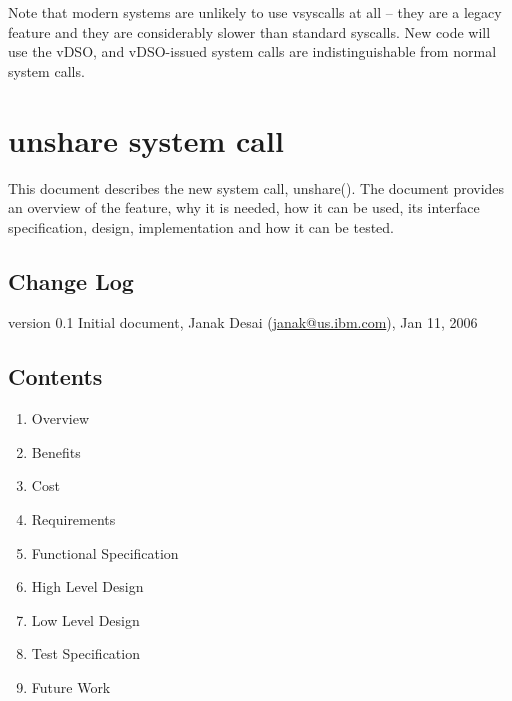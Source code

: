 \documentclass[a4paper,8pt,english]{sphinxmanual}
\begin{document}
Note that modern systems are unlikely to use vsyscalls at all -- they
are a legacy feature and they are considerably slower than standard
syscalls.  New code will use the vDSO, and vDSO-issued system calls
are indistinguishable from normal system calls.


\chapter{unshare system call}
\label{userspace-api/unshare:unshare-system-call}\label{userspace-api/unshare::doc}
This document describes the new system call, unshare(). The document
provides an overview of the feature, why it is needed, how it can
be used, its interface specification, design, implementation and
how it can be tested.


\section{Change Log}
\label{userspace-api/unshare:change-log}
version 0.1  Initial document, Janak Desai (\href{mailto:janak@us.ibm.com}{janak@us.ibm.com}), Jan 11, 2006


\section{Contents}
\label{userspace-api/unshare:contents}\begin{enumerate}
\item {} 
Overview

\item {} 
Benefits

\item {} 
Cost

\item {} 
Requirements

\item {} 
Functional Specification

\item {} 
High Level Design

\item {} 
Low Level Design

\item {} 
Test Specification

\item {} 
Future Work

\end{enumerate}
\end{document}
